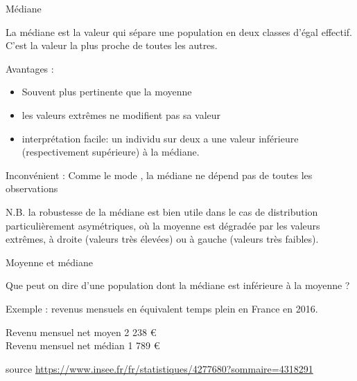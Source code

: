 \documentclass{beamer}
\begin{document}
\begin{frame}{Médiane}

La \alert{médiane} est la valeur qui sépare une population en \alert{deux} classes d'égal effectif.\\

C'est la valeur la plus proche de toutes les autres.


\begin{spacing}{0.9}
\begin{small}
Avantages  : 
\begin{itemize}
\item Souvent plus pertinente que la moyenne
\item les valeurs extrêmes ne modifient pas sa valeur
\item interprétation  facile: un individu sur deux a une valeur inférieure (respectivement supérieure) à la médiane.
\end{itemize}
\end{small}
\end{spacing}


Inconvénient : Comme le mode , la médiane ne dépend pas de toutes les observations 

\begin{tiny}
\begin{spacing}{0.9}
\alert{N.B.} la robustesse de la médiane est bien utile dans le cas de distribution particulièrement asymétriques, où la moyenne est dégradée par les valeurs extrêmes, à droite (valeurs très élevées) ou à gauche (valeurs très faibles).
\end{spacing}
\end{tiny}

\end{frame}




\begin{frame}{Moyenne et médiane}

Que peut on dire d'une population dont la médiane est inférieure à la moyenne ? 


Exemple : revenus mensuels en équivalent temps plein en France en 2016.

Revenu mensuel net moyen 2 238 €\\
Revenu mensuel net médian 1 789 € 

\vspace{2cm}
\begin{tiny}
source \url{https://www.insee.fr/fr/statistiques/4277680?sommaire=4318291}
\end{tiny}


\end{frame}
\end{document}
